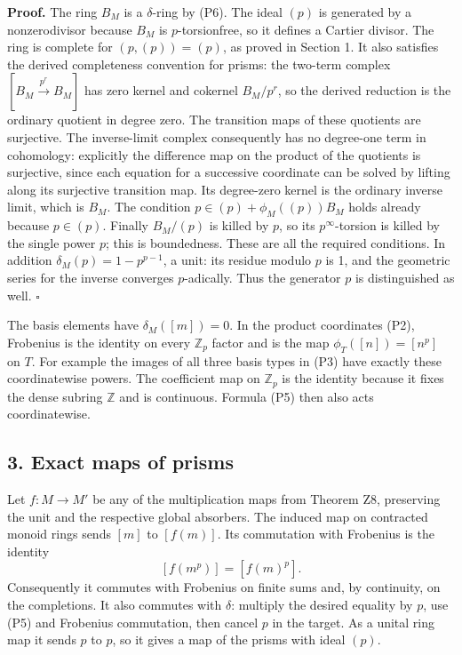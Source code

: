 \documentclass[
]{article}
\begin{document}
\textbf{Proof.} The ring \(B_M\) is a \(\delta\)-ring by (P6). The ideal
\((p)\) is generated by a nonzerodivisor because \(B_M\) is
\(p\)-torsionfree, so it defines a Cartier divisor. The ring is complete
for \((p,(p))=(p)\), as proved in Section 1. It also satisfies the
derived completeness convention for prisms: the two-term complex
\([B_M\xrightarrow{p^r}B_M]\) has zero kernel and cokernel \(B_M/p^r\),
so the derived reduction is the ordinary quotient in degree zero. The
transition maps of these quotients are surjective. The inverse-limit
complex consequently has no degree-one term in cohomology: explicitly
the difference map on the product of the quotients is surjective, since
each equation for a successive coordinate can be solved by lifting along
its surjective transition map. Its degree-zero kernel is the ordinary
inverse limit, which is \(B_M\). The condition
\(p\in(p)+\phi_M((p))B_M\) holds already because \(p\in(p)\). Finally
\(B_M/(p)\) is killed by \(p\), so its \(p^\infty\)-torsion is killed by
the single power \(p\); this is boundedness. These are all the required
conditions. In addition \(\delta_M(p)=1-p^{p-1}\), a unit: its residue
modulo \(p\) is 1, and the geometric series for the inverse converges
\(p\)-adically. Thus the generator \(p\) is distinguished as well.
\(\square\)

The basis elements have \(\delta_M([m])=0\). In the product coordinates
(P2), Frobenius is the identity on every \(\mathbb Z_p\) factor and is
the map \(\phi_T([n])=[n^p]\) on \(T\). For example the images of all
three basis types in (P3) have exactly these coordinatewise powers. The
coefficient map on \(\mathbb Z_p\) is the identity because it fixes the
dense subring \(\mathbb Z\) and is continuous. Formula (P5) then also
acts coordinatewise.

\subsection{3. Exact maps of prisms}\label{exact-maps-of-prisms}

Let \(f:M\to M'\) be any of the multiplication maps from Theorem Z8,
preserving the unit and the respective global absorbers. The induced map
on contracted monoid rings sends \([m]\) to \([f(m)]\). Its commutation
with Frobenius is the identity \[
[f(m^p)]=[f(m)^p].
\tag{P7}
\] Consequently it commutes with Frobenius on finite sums and, by
continuity, on the completions. It also commutes with \(\delta\):
multiply the desired equality by \(p\), use (P5) and Frobenius
commutation, then cancel \(p\) in the target. As a unital ring map it
sends \(p\) to \(p\), so it gives a map of the prisms with ideal
\((p)\).
\end{document}
